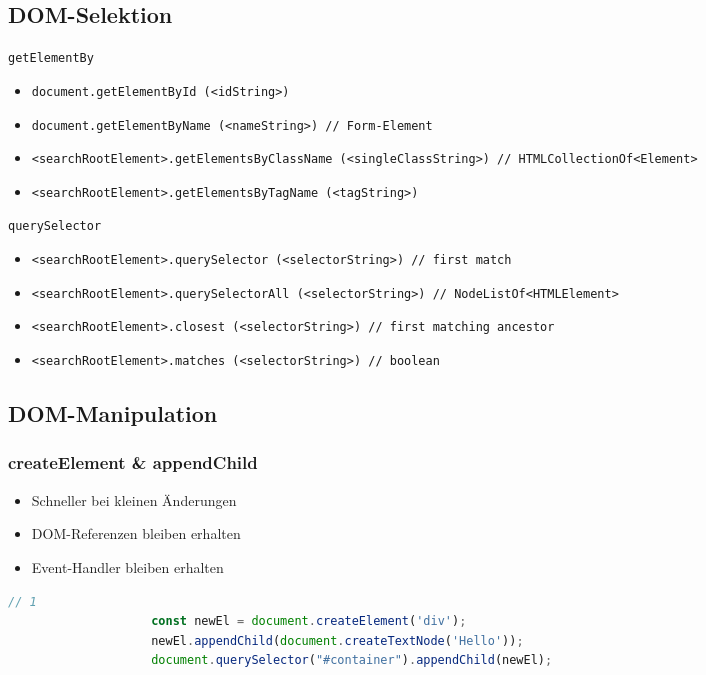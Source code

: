 \documentclass[a4paper, landscape, 8pt]{scrartcl}
\begin{document}
\begin{multicols*}{4}
        \subsection{DOM-Selektion}
        {\small\texttt{getElementBy}}
        \begin{itemize}
            \item \texttt{document.getElementById (<idString>)}
            \item \texttt{document.getElementByName (<nameString>) // Form-Element}
            \item \texttt{<searchRootElement>.getElementsByClassName (<singleClassString>) // HTMLCollectionOf<Element>}
            \item \texttt{<searchRootElement>.getElementsByTagName (<tagString>)}
        \end{itemize}

        {\small\texttt{querySelector}}
        \begin{itemize}
            \item \texttt{<searchRootElement>.querySelector (<selectorString>) // first match}
            \item \texttt{<searchRootElement>.querySelectorAll (<selectorString>) // NodeListOf<HTMLElement>}
            \item \texttt{<searchRootElement>.closest (<selectorString>) // first matching ancestor}
            \item \texttt{<searchRootElement>.matches (<selectorString>) // boolean}
        \end{itemize}


        \subsection{DOM-Manipulation}
        \subsubsection{createElement \& appendChild}
        \begin{itemize}
            \item Schneller bei kleinen Änderungen
            \item DOM-Referenzen bleiben erhalten
            \item Event-Handler bleiben erhalten
        \end{itemize}
        \begin{lstlisting}[language=JavaScript]
                    // 1
                    const newEl = document.createElement('div');
                    newEl.appendChild(document.createTextNode('Hello'));
                    document.querySelector("#container").appendChild(newEl);


\end{lstlisting}
\end{multicols*}
\end{document}
